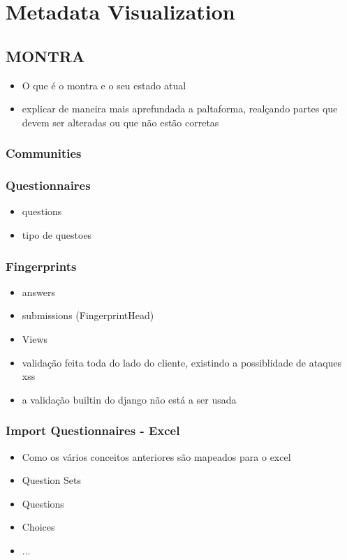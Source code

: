 \chapter{Metadata Visualization}
\label{chapter:metadata-visualization}

\section{MONTRA}
\begin{itemize}
    \item O que é o montra e o seu estado atual
    \item explicar de maneira mais aprefundada a paltaforma, realçando partes que devem ser alteradas ou que não estão corretas
\end{itemize}

\subsection{Communities}
\subsection{Questionnaires}
\begin{itemize}
    \item questions
    \item tipo de questoes
\end{itemize}

\subsection{Fingerprints}
\begin{itemize}
    \item answers
    \item submissions (FingerprintHead)
    \item Views
    \item validação feita toda do lado do cliente, existindo a possiblidade de ataques xss
    \item a validação builtin do django não está a ser usada
\end{itemize}

\subsection{Import Questionnaires - Excel}
\begin{itemize}
    \item Como os vários conceitos anteriores são mapeados para o excel
    \item Question Sets
    \item Questions
    \item Choices
    \item ...
\end{itemize}


